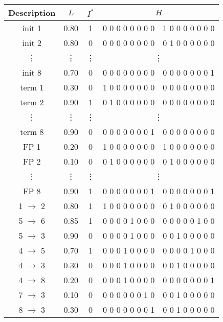 \documentclass[11pt]{article}
\begin{document}
\begin{longtable}[c]{@{}ccccc@{}}
Description & $L$ & $I^*$ & \multicolumn{2}{c}{$H$}\tabularnewline
\hline
\rowcolor{Gray}
init 1 & 0.80 & 1 & 0 0 0 0 0 0 0 0 & 1 0 0 0 0 0 0 0\tabularnewline
init 2 & 0.80 & 0 & 0 0 0 0 0 0 0 0 & 0 1 0 0 0 0 0 0\tabularnewline
\vdots & \vdots & \vdots & \multicolumn{2}{c}{\vdots} \\
init 8 & 0.70 & 0 & 0 0 0 0 0 0 0 0 & 0 0 0 0 0 0 0 1\tabularnewline
term 1 & 0.30 & 0 & 1 0 0 0 0 0 0 0 & 0 0 0 0 0 0 0 0\tabularnewline
\rowcolor{Gray}
term 2 & 0.90 & 1 & 0 1 0 0 0 0 0 0 & 0 0 0 0 0 0 0 0\tabularnewline
\vdots & \vdots & \vdots & \multicolumn{2}{c}{\vdots} \\
term 8 & 0.90 & 0 & 0 0 0 0 0 0 0 1 & 0 0 0 0 0 0 0 0\tabularnewline
FP 1 & 0.20 & 0 & 1 0 0 0 0 0 0 0 & 1 0 0 0 0 0 0 0\tabularnewline
FP 2 & 0.10 & 0 & 0 1 0 0 0 0 0 0 & 0 1 0 0 0 0 0 0\tabularnewline
\vdots & \vdots & \vdots & \multicolumn{2}{c}{\vdots} \\
\rowcolor{Gray}
FP 8 & 0.90 & 1 & 0 0 0 0 0 0 0 1 & 0 0 0 0 0 0 0 1\tabularnewline
1 $\rightarrow$ 2 & 0.80 & 1 & 1 0 0 0 0 0 0 0 & 0 1 0 0 0 0 0
0\tabularnewline
5 $\rightarrow$ 6 & 0.85 & 1 & 0 0 0 0 1 0 0 0 & 0 0 0 0 0 1 0
0\tabularnewline
5 $\rightarrow$ 3 & 0.90 & 0 & 0 0 0 0 1 0 0 0 & 0 0 1 0 0 0 0
0\tabularnewline
\rowcolor{Gray}
4 $\rightarrow$ 5 & 0.70 & 1 & 0 0 0 1 0 0 0 0 & 0 0 0 0 1 0 0
0\tabularnewline
4 $\rightarrow$ 3 & 0.30 & 0 & 0 0 0 1 0 0 0 0 & 0 0 1 0 0 0 0
0\tabularnewline
4 $\rightarrow$ 8 & 0.20 & 0 & 0 0 0 1 0 0 0 0 & 0 0 0 0 0 0 0
1\tabularnewline
7 $\rightarrow$ 3 & 0.10 & 0 & 0 0 0 0 0 0 1 0 & 0 0 1 0 0 0 0
0\tabularnewline
8 $\rightarrow$ 3 & 0.30 & 0 & 0 0 0 0 0 0 0 1 & 0 0 1 0 0 0 0
0\tabularnewline
\end{longtable}
\end{document}
